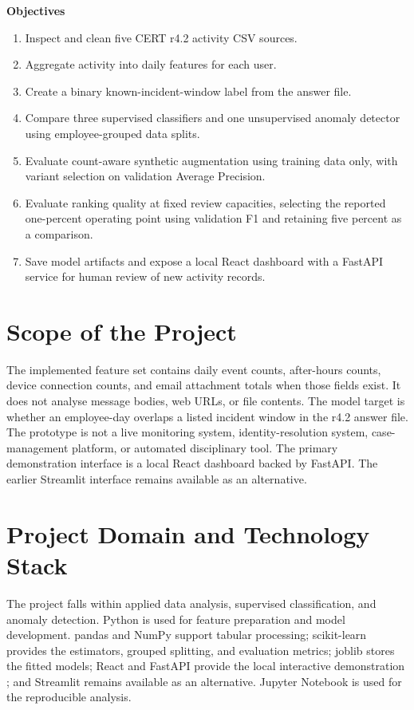 \documentclass[12pt,a4paper,oneside]{report}
\begin{document}
\textbf{Objectives}
\begin{enumerate}
  \item Inspect and clean five CERT r4.2 activity CSV sources.
  \item Aggregate activity into daily features for each user.
  \item Create a binary known-incident-window label from the answer file.
  \item Compare three supervised classifiers and one unsupervised anomaly
        detector using employee-grouped data splits.
  \item Evaluate count-aware synthetic augmentation using training data
        only, with variant selection on validation Average Precision.
  \item Evaluate ranking quality at fixed review capacities, selecting
        the reported one-percent operating point using validation F1 and
        retaining five percent as a comparison.
  \item Save model artifacts and expose a local React dashboard with a
        FastAPI service for human review of new activity records.
\end{enumerate}

\section{Scope of the Project}
The implemented feature set contains daily event counts, after-hours
counts, device connection counts, and email attachment totals when those
fields exist. It does not analyse message bodies, web URLs, or file
contents. The model target is whether an employee-day overlaps a listed
incident window in the r4.2 answer file. The prototype is not a live
monitoring system, identity-resolution system, case-management platform,
or automated disciplinary tool. The primary demonstration interface is
a local React dashboard backed by FastAPI. The earlier Streamlit
interface remains available as an alternative.

\section{Project Domain and Technology Stack}
The project falls within applied data analysis, supervised classification,
and anomaly detection. Python is used for feature preparation and model
development. pandas and NumPy support tabular processing; scikit-learn
provides the estimators, grouped splitting, and evaluation metrics; joblib
stores the fitted models; React and FastAPI provide the local interactive
demonstration \cite{reactdocs,fastapidocs}; and Streamlit remains
available as an alternative. Jupyter Notebook is used for the
reproducible analysis.
\end{document}
